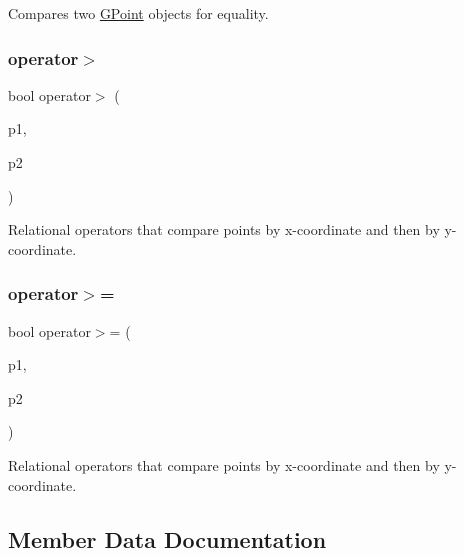 Compares two \mbox{\hyperlink{structsgl_1_1GPoint}{G\+Point}} objects for equality. 

\mbox{\label{structsgl_1_1GPoint_a2ef77d4bff099bb0440be3bde3341bd1}} 
\subsubsection{\texorpdfstring{operator$>$}{operator>}}
{\footnotesize\ttfamily bool operator$>$ (\begin{DoxyParamCaption}\item[{const \mbox{\hyperlink{structsgl_1_1GPoint}{G\+Point}} \&}]{p1,  }\item[{const \mbox{\hyperlink{structsgl_1_1GPoint}{G\+Point}} \&}]{p2 }\end{DoxyParamCaption})\hspace{0.3cm}{\ttfamily [friend]}}



Relational operators that compare points by x-\/coordinate and then by y-\/coordinate. 

\mbox{\label{structsgl_1_1GPoint_a0f6d51aeb0175e5c7ae32b43f732a742}} 
\subsubsection{\texorpdfstring{operator$>$=}{operator>=}}
{\footnotesize\ttfamily bool operator$>$= (\begin{DoxyParamCaption}\item[{const \mbox{\hyperlink{structsgl_1_1GPoint}{G\+Point}} \&}]{p1,  }\item[{const \mbox{\hyperlink{structsgl_1_1GPoint}{G\+Point}} \&}]{p2 }\end{DoxyParamCaption})\hspace{0.3cm}{\ttfamily [friend]}}



Relational operators that compare points by x-\/coordinate and then by y-\/coordinate. 



\subsection{Member Data Documentation}
\mbox{\label{structsgl_1_1GPoint_af88b946fb90d5f08b5fb740c70e98c10}} 
